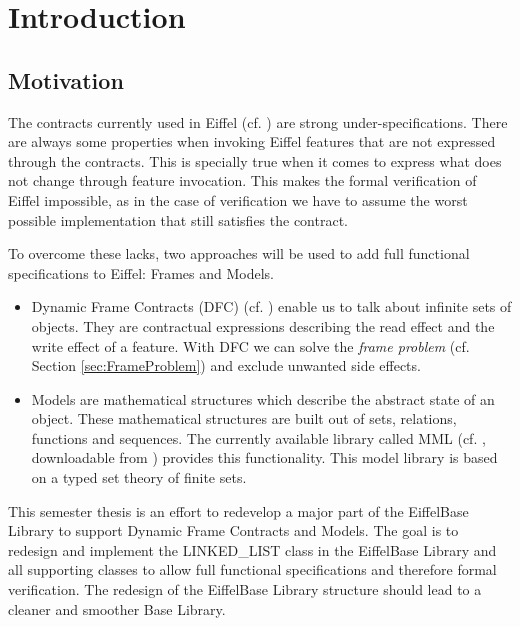 
\chapter{Introduction}
\label{sec:Introduction}

\section{Motivation}
\label{sec:Motivation}

The contracts currently used in Eiffel (cf. \cite{Meyer92Eiffel, Meyer92Applying, Meyer97Object}) are strong under-specifications. There are always some properties when invoking Eiffel features that are not expressed through the contracts. This is specially true when it comes to express what does not change through feature invocation. This makes the formal verification of Eiffel impossible, as in the case of verification we have to assume the worst possible implementation that still satisfies the contract.

To overcome these lacks, two approaches will be used to add full functional specifications to Eiffel: Frames and Models.
\begin{itemize}
\item Dynamic Frame Contracts (DFC) (cf. \cite{SchoellerDynamic}) enable us to talk about infinite sets of objects. They are contractual expressions describing the read effect and the write effect of a feature. With DFC we can solve the \emph{frame problem} (cf. Section \ref{sec:FrameProblem}) and exclude unwanted side effects.
\item Models are mathematical structures which describe the abstract state of an object. These mathematical structures are built out of sets, relations, functions and sequences. The currently available library called MML (cf. \cite{Widmer04Reusable}, downloadable from \cite{MML}) provides this functionality. This model library is based on a typed set theory of finite sets.
\end{itemize}

This semester thesis is an effort to redevelop a major part of the EiffelBase Library to support Dynamic Frame Contracts and Models. The goal is to redesign and implement the LINKED\_LIST class in the EiffelBase Library and all supporting classes to allow full functional specifications and therefore formal verification. The redesign of the EiffelBase Library structure should lead to a cleaner and smoother Base Library.

